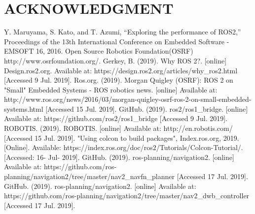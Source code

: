 \documentclass[letterpaper, 10 pt, conference]{ieeeconf}  %
\begin{document}
\section*{ACKNOWLEDGMENT}
\begin{thebibliography}{99}

 Y. Maruyama, S. Kato, and T. Azumi, “Exploring the performance of ROS2,” Proceedings of the 13th International Conference on Embedded Software - EMSOFT 16, 2016. 
 Open Source Robotics Foundation(OSRF) http://www.osrfoundation.org/.
 Gerkey, B. (2019). Why ROS 2?. [online] Design.ros2.org. Available at: https://design.ros2.org/articles/why\_ros2.html [Accessed 9 Jul. 2019].
Ros.org. (2019). Morgan Quigley (OSRF): ROS 2 on "Small" Embedded Systems - ROS robotics news. [online] Available at: http://www.ros.org/news/2016/03/morgan-quigley-osrf-ros-2-on-small-embedded-systems.html [Accessed 15 Jul. 2019].
 GitHub. (2019). ros2/ros1\_bridge. [online] Available at: https://github.com/ros2/ros1\_bridge [Accessed 9 Jul. 2019].
 ROBOTIS. (2019). ROBOTIS. [online] Available at: http://en.robotis.com/ [Accessed 15 Jul. 2019].
 "Using colcon to build packages", Index.ros.org, 2019. [Online]. Available: https://index.ros.org/doc/ros2/Tutorials/Colcon-Tutorial/. [Accessed: 16- Jul- 2019].
 GitHub. (2019). ros-planning/navigation2. [online] Available at: https://github.com/ros-planning/navigation2/tree/master/nav2\_navfn\_planner [Accessed 17 Jul. 2019].
 GitHub. (2019). ros-planning/navigation2. [online] Available at: https://github.com/ros-planning/navigation2/tree/master/nav2\_dwb\_controller [Accessed 17 Jul. 2019].
\end{thebibliography}
\end{document}
